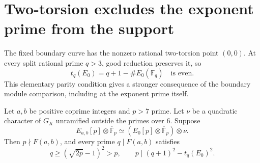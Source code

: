 \section{Two-torsion excludes the exponent prime from the support}
\label{ts-section}

The fixed boundary curve has the nonzero rational two-torsion point
$(0,0)$. At every split rational prime $q>3$, good reduction preserves
it, so
\begin{equation}\label{ts-even-trace}
 t_q(E_0)=q+1-\#E_0(\mathbb F_q)\quad\text{is even}.
\end{equation}
This elementary parity condition gives a stronger consequence of the
boundary module comparison, including at the exponent prime itself.

\begin{theorem}
\label{ts-boundary-support}
Let $a,b$ be positive coprime integers and $p>7$ prime. Let $\nu$
be a quadratic character of $G_K$ unramified outside the primes over
$6$. Suppose
\begin{equation}\label{ts-module}
 E_{a,b}[p]\otimes\overline{\mathbb F}_p
 \simeq(E_0[p]\otimes\overline{\mathbb F}_p)\otimes\nu.
\end{equation}
Then $p\nmid F(a,b)$, and every prime $q\mid F(a,b)$ satisfies
\begin{equation}\label{ts-strong-cutoff}
 q\ge(\sqrt{2p}-1)^2>p,
 \qquad p\mid(q+1)^2-t_q(E_0)^2.
\end{equation}
\end{theorem}

